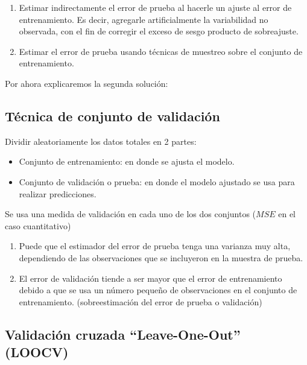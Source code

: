 \documentclass[
  12pt,
]{book}
\providecommand{\tightlist}{%
  \setlength{\itemsep}{0pt}\setlength{\parskip}{0pt}}
\theoremstyle{definition}
\theoremstyle{definition}
\theoremstyle{definition}
\theoremstyle{definition}
\theoremstyle{remark}
\begin{document}
\begin{enumerate}
\def\labelenumi{\alph{enumi}.}
\tightlist
\item
  Estimar indirectamente el error de prueba al hacerle un ajuste al error de entrenamiento. Es decir, agregarle artificialmente la variabilidad no observada, con el fin de corregir el exceso de sesgo producto de sobreajuste.
\item
  Estimar el error de prueba usando técnicas de muestreo sobre el conjunto de entrenamiento.
\end{enumerate}

Por ahora explicaremos la segunda solución:

\hypertarget{tuxe9cnica-de-conjunto-de-validaciuxf3n}{%
\subsection{Técnica de conjunto de validación}\label{tuxe9cnica-de-conjunto-de-validaciuxf3n}}

Dividir aleatoriamente los datos totales en 2 partes:

\begin{itemize}
\tightlist
\item
  Conjunto de entrenamiento: en donde se ajusta el modelo.
\item
  Conjunto de validación o prueba: en donde el modelo ajustado se usa para realizar predicciones.
\end{itemize}

Se usa una medida de validación en cada uno de los dos conjuntos (\(MSE\) en el caso cuantitativo)

\begin{enumerate}
\def\labelenumi{\arabic{enumi}.}
\tightlist
\item
  Puede que el estimador del error de prueba tenga una varianza muy alta, dependiendo de las observaciones que se incluyeron en la muestra de prueba.
\item
  El error de validación tiende a ser mayor que el error de entrenamiento debido a que se usa un número pequeño de observaciones en el conjunto de entrenamiento. (sobreestimación del error de prueba o validación)
\end{enumerate}

\hypertarget{validaciuxf3n-cruzada-leave-one-out-loocv}{%
\subsection{Validación cruzada ``Leave-One-Out'' (LOOCV)}\label{validaciuxf3n-cruzada-leave-one-out-loocv}}
\end{document}
